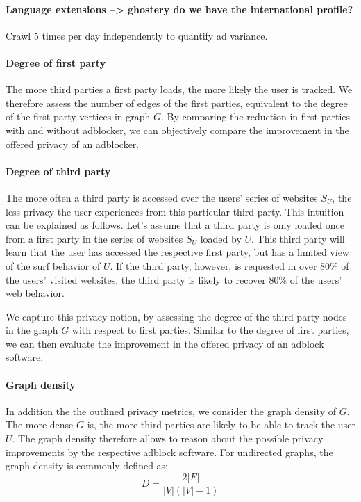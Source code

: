 \documentclass{sig-alternate}
\begin{document}
\paragraph{Language extensions --> ghostery do we have the international profile?}

Crawl 5 times per day independently to quantify ad variance.

\paragraph{Degree of first party}
The more third parties a first party loads, the more likely the user is tracked. We therefore assess the number of edges of the first parties, equivalent to the degree of the first party vertices in graph $G$. By comparing the reduction in first parties with and without adblocker, we can objectively compare the improvement in the offered privacy of an adblocker.

\paragraph{Degree of third party}
The more often a third party is accessed over the users' series of websites $S_U$, the less privacy the user experiences from this particular third party. This intuition can be explained as follows. Let's assume that a third party is only loaded once from a first party in the series of websites $S_U$ loaded by $U$. This third party will learn that the user has accessed the respective first party, but has a limited view of the surf behavior of $U$. If the third party, however, is requested in over 80\% of the users' visited websites, the third party is likely to recover 80\% of the users' web behavior.

We capture this privacy notion, by assessing the degree of the third party nodes in the graph $G$ with respect to first parties.
Similar to the degree of first parties, we can then evaluate the improvement in the offered privacy of an adblock software.

\paragraph{Graph density}
In addition the the outlined privacy metrics, we consider the graph density of $G$. The more dense $G$ is, the more third parties are likely to be able to track the user $U$. The graph density therefore allows to reason about the possible privacy improvements by the respective adblock software. For undirected graphs, the graph density is commonly defined as:
\begin{equation}
D = \frac{2 |E|}{|V|(|V|-1)}
\end{equation}
\end{document}
